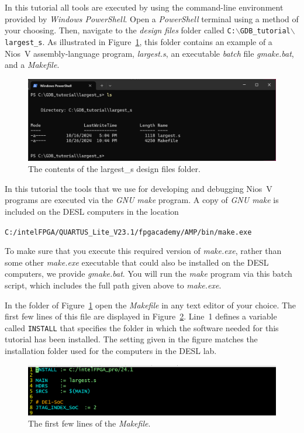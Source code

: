 \documentclass[11pt, twoside, pdftex]{article}
\begin{document}
In this tutorial all tools are executed by using the command-line environment 
provided by {\it Windows PowerShell}.
Open a {\it PowerShell} terminal using a method of your choosing.  Then, navigate to the 
{\it design files} folder called \texttt{C:$\backslash$GDB\_tutorial$\backslash$largest\_s}. 
As illustrated in Figure~\ref{fig:largest1}, this folder contains an example of a 
Nios~V assembly-language program, {\it largest.s}, an executable {\it batch} file 
{\it gmake.bat}, and a {\it Makefile}. 

\begin{figure}[h]
    \begin{center}
        \includegraphics[width=.9\linewidth]{figures/largest1.png}
        \caption{The contents of the largest\_s design files folder.}
        \label{fig:largest1}
    \end{center}
\end{figure}

In this tutorial the tools that we use for developing and debugging Nios~V programs are 
executed via the {\it GNU make} program. A copy of {\it GNU make} is included on the DESL
computers in the location 

\texttt{C:/intelFPGA/QUARTUS\_Lite\_V23.1/fpgacademy/AMP/bin/make.exe}

To make sure that you execute this required version of {\it make.exe}, rather than some other 
{\it make.exe} executable that could also be installed on the DESL computers, we provide 
{\it gmake.bat}.  You will run the {\it make} program via this batch script, which
includes the full path given above to {\it make.exe}.

In the folder of Figure~\ref{fig:largest1} open the {\it Makefile} in any text editor of your
choice. The first few lines of this file are displayed in Figure~\ref{fig:firstfew}.
Line~1 defines a variable called \texttt{INSTALL} that specifies the folder in which the 
software needed for this tutorial has been installed. The setting given in the figure matches 
the installation folder used for the computers in the DESL lab.

\begin{figure}[h]
    \begin{center}
        \includegraphics[scale=.5]{figures/firstfew.png}
        \caption{The first few lines of the {\it Makefile}.}
        \label{fig:firstfew}
    \end{center}
\end{figure}
\end{document}
